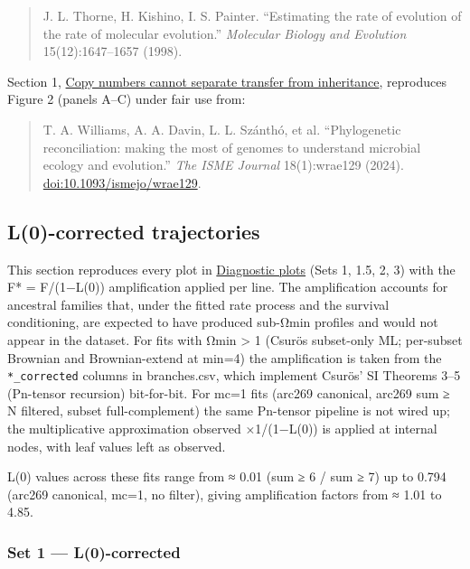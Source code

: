 \documentclass[
  10pt,
]{article}
\begin{document}
\begin{quote}
J. L. Thorne, H. Kishino, I. S. Painter. ``Estimating the rate of
evolution of the rate of molecular evolution.'' \emph{Molecular Biology
and Evolution} 15(12):1647--1657 (1998).
\end{quote}

Section 1,
\hyperref[1--copy-numbers-cannot-separate-transfer-from-inheritance]{Copy
numbers cannot separate transfer from inheritance}, reproduces Figure 2
(panels A--C) under fair use from:

\begin{quote}
T. A. Williams, A. A. Davin, L. L. Szánthó, et al. ``Phylogenetic
reconciliation: making the most of genomes to understand microbial
ecology and evolution.'' \emph{The ISME Journal} 18(1):wrae129 (2024).
\href{https://doi.org/10.1093/ismejo/wrae129}{doi:10.1093/ismejo/wrae129}.
\end{quote}

\subsection{L(0)-corrected
trajectories}\label{l0-corrected-trajectories}

This section reproduces every plot in
\hyperref[diagnostic-plots]{Diagnostic plots} (Sets 1, 1.5, 2, 3) with
the F* = F/(1−L(0)) amplification applied per line. The amplification
accounts for ancestral families that, under the fitted rate process and
the survival conditioning, are expected to have produced sub-Ωmin
profiles and would not appear in the dataset. For fits with Ωmin
\textgreater{} 1 (Csurös subset-only ML; per-subset Brownian and
Brownian-extend at min=4) the amplification is taken from the
\texttt{*\_corrected} columns in branches.csv, which implement Csurös'
SI Theorems 3--5 (Pn-tensor recursion) bit-for-bit. For mc=1 fits
(arc269 canonical, arc269 sum ≥ N filtered, subset full-complement) the
same Pn-tensor pipeline is not wired up; the multiplicative
approximation observed ×1/(1−L(0)) is applied at internal nodes, with
leaf values left as observed.

L(0) values across these fits range from ≈ 0.01 (sum ≥ 6 / sum ≥ 7) up
to 0.794 (arc269 canonical, mc=1, no filter), giving amplification
factors from ≈ 1.01 to 4.85.

\subsubsection{Set 1 --- L(0)-corrected}\label{set-1--l0-corrected}
\end{document}
